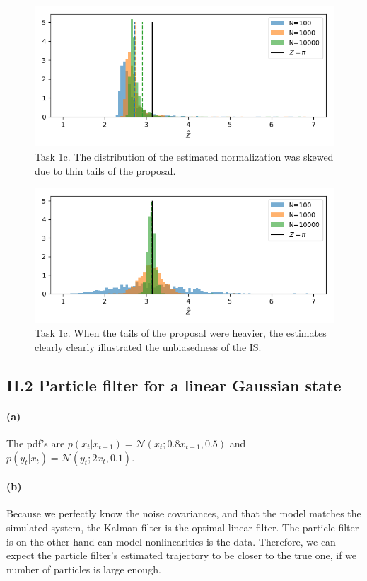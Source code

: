\documentclass{article}
\begin{document}
\begin{figure}[h]
	\centering
	\includegraphics[width=.7\linewidth]{1_c_hist1}
	\caption{Task 1c. The distribution of the estimated normalization was skewed due to thin tails of the proposal.}
	\label{fig:1chist1}
\end{figure}
\begin{figure}[h]
	\centering
	\includegraphics[width=.7\linewidth]{1_c_hist2}
	\caption{Task 1c. When the tails of the proposal were heavier, the estimates clearly clearly illustrated the unbiasedness of the IS.}
	\label{fig:1chist2}
\end{figure}





\subsection*{H.2 Particle filter for a linear Gaussian state}
\paragraph{(a)} The pdf's are $p(x_t|x_{t-1}) = \mathcal{N}(x_t; 0.8x_{t-1}, 0.5)$ and $ p(y_t|x_t) = \mathcal{N}(y_t;2x_t, 0.1) $.

\paragraph{(b)} Because we perfectly know the noise covariances, and that the model matches the simulated system, the Kalman filter is the optimal linear filter. The particle filter is on the other hand can model nonlinearities is the data. Therefore, we can expect the particle filter's estimated trajectory to be closer to the true one, if we number of particles is large enough.
\end{document}
